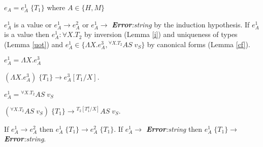 \begin{case}
$e_{A}=e_{A}^{1}\;\lbrace T_{1}\rbrace$ where $A\in\lbrace H,M\rbrace$

$e_{A}^{1}$ is a value or $e_{A}^{1}\rightarrow e_{A}^{2}$ or $e_{A}^{1}\rightarrow$ \emph{\textbf{Error}:\;string} by the induction hypothesis.  If $e_{A}^{1}$ is a value then $e_{A}^{1}:\forall X.T_{2}$ by inversion (Lemma \ref{i}) and uniqueness of types (Lemma \ref{uot}) and $e_{A}^{1}\in\lbrace\Lambda X.e_{A}^{3},{^{\forall X.T_{2}}A}S\;v_{S}\rbrace$ by canonical forms (Lemma \ref{cf}).
\begin{subcase}
$e_{A}^{1}=\Lambda X.e_{A}^{3}$

$(\Lambda X.e_{A}^{3})\;\lbrace T_{1}\rbrace\rightarrow e_{A}^{3}[T_{1}/X]$.
\end{subcase}
\begin{subcase}
$e_{A}^{1}={^{\forall X.T_{2}}A}S\;v_{S}$

$(^{\forall X.T_{2}}AS\;v_{S})\;\lbrace T_{1}\rbrace\rightarrow{^{T_{2}[T_{1}^{a}/X]}A}S\;v_{S}$.
\end{subcase}
If $e_{A}^{1}\rightarrow e_{A}^{2}$ then $e_{A}^{1}\;\lbrace T_{1}\rbrace\rightarrow e_{A}^{2}\;\lbrace T_{1}\rbrace$.  If $e_{A}^{1}\rightarrow$ \emph{\textbf{Error}:\;string} then $e_{A}^{1}\;\lbrace T_{1}\rbrace\rightarrow$ \emph{\textbf{Error}:\;string}.
\end{case}